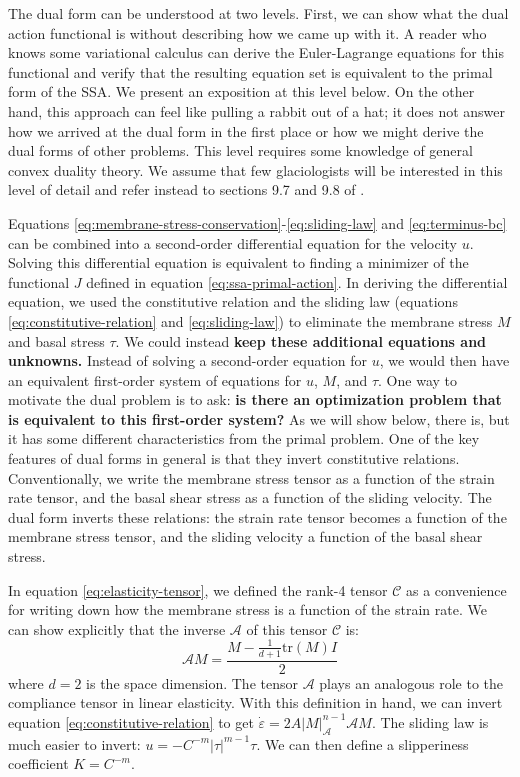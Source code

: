 \documentclass{article}
\theoremstyle{definition}
\theoremstyle{plain}
\begin{document}
The dual form can be understood at two levels.
First, we can show what the dual action functional is without describing how we came up with it.
A reader who knows some variational calculus can derive the Euler-Lagrange equations for this functional and verify that the resulting equation set is equivalent to the primal form of the SSA.
We present an exposition at this level below.
On the other hand, this approach can feel like pulling a rabbit out of a hat; it does not answer how we arrived at the dual form in the first place or how we might derive the dual forms of other problems.
This level requires some knowledge of general convex duality theory.
We assume that few glaciologists will be interested in this level of detail and refer instead to sections 9.7 and 9.8 of \citet{attouch2014variational}.

Equations \eqref{eq:membrane-stress-conservation}-\eqref{eq:sliding-law} and \eqref{eq:terminus-bc} can be combined into a second-order differential equation for the velocity $u$.
Solving this differential equation is equivalent to finding a minimizer of the functional $J$ defined in equation \eqref{eq:ssa-primal-action}.
In deriving the differential equation, we used the constitutive relation and the sliding law (equations \eqref{eq:constitutive-relation} and \eqref{eq:sliding-law}) to eliminate the membrane stress $M$ and basal stress $\tau$.
We could instead \textbf{keep these additional equations and unknowns.}
Instead of solving a second-order equation for $u$, we would then have an equivalent first-order system of equations for $u$, $M$, and $\tau$.
One way to motivate the dual problem is to ask: \textbf{is there an optimization problem that is equivalent to this first-order system?}
As we will show below, there is, but it has some different characteristics from the primal problem.
One of the key features of dual forms in general is that they invert constitutive relations.
Conventionally, we write the membrane stress tensor as a function of the strain rate tensor, and the basal shear stress as a function of the sliding velocity.
The dual form inverts these relations: the strain rate tensor becomes a function of the membrane stress tensor, and the sliding velocity a function of the basal shear stress.

In equation \eqref{eq:elasticity-tensor}, we defined the rank-4 tensor $\mathscr{C}$ as a convenience for writing down how the membrane stress is a function of the strain rate.
We can show explicitly that the inverse $\mathscr{A}$ of this tensor $\mathscr{C}$ is:
\begin{equation}
    \mathscr{A}M = \frac{M - \frac{1}{d + 1}\text{tr}(M)I}{2}
\end{equation}
where $d = 2$ is the space dimension.
The tensor $\mathscr{A}$ plays an analogous role to the compliance tensor in linear elasticity.
With this definition in hand, we can invert equation \eqref{eq:constitutive-relation} to get $\dot\varepsilon = 2A|M|_{\mathscr{A}}^{n - 1}\mathscr{A}M$.
The sliding law is much easier to invert: $u = -C^{-m}|\tau|^{m - 1}\tau$.
We can then define a slipperiness coefficient $K = C^{-m}$.
\end{document}
